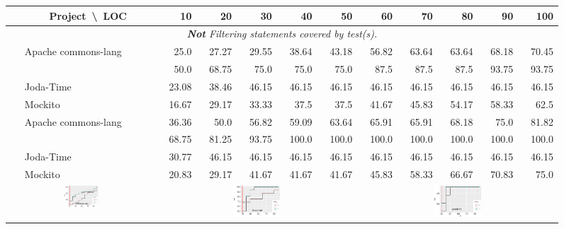 \documentclass[sigplan,10pt,review,anonymous]{acmart}\settopmatter{printfolios=true,printccs=false,printacmref=false}
\begin{document}
\begin{figure}[!ht]
  \centering
    \begin{tabular}{cl|rrrrrrrrrr}
      \toprule
      & \multicolumn{1}{c|}{Project~\textbackslash{}~LOC}             & 10  & 20  & 30  &  40  & 50  & 60 & 70 &  80 &  90& 100 \\
      \midrule

      \multicolumn{12}{c}{\emph{\textbf{Not} Filtering statements covered by test(s).}}\\
      \midrule
      \parbox[t]{2mm}{}
      &Apache commons-lang     & 25.0  & 27.27 & 29.55 & 38.64 & 43.18
      & 56.82 & 63.64 & 63.64 & 68.18 & 70.45 \\
      &\chart{}       & 50.0  & 68.75 & 75.0  & 75.0  & 75.0  & 87.5  & 87.5  & 87.5  & 93.75 & 93.75 \\
      &Joda-Time       & 23.08 & 38.46 & 46.15 & 46.15 & 46.15 & 46.15
      & 46.15 & 46.15 & 46.15 & 46.15 \\
      &Mockito & 16.67 & 29.17 & 33.33 & 37.5  & 37.5  & 41.67 & 45.83
      & 54.17 & 58.33 & 62.5 \\
      \hline
      \parbox[t]{2mm}{}
      &Apache commons-lang     & 36.36 & 50.0  & 56.82 & 59.09 & 63.64
      & 65.91 & 65.91 & 68.18 & 75.0  & 81.82 \\
      & \chart{}       & 68.75 & 81.25 & 93.75 & 100.0 & 100.0 & 100.0 & 100.0 & 100.0 & 100.0 & 100.0 \\
      &Joda-Time       & 30.77 & 46.15 & 46.15 & 46.15 & 46.15 & 46.15
      & 46.15 & 46.15 & 46.15 & 46.15 \\
      &Mockito & 20.83 & 29.17 & 41.67 & 41.67 & 41.67 & 45.83 & 58.33
      & 66.67 & 70.83 & 75.0 \\
      \midrule

      &
      &
      \\


\end{tabular}
\end{figure}
\end{document}
